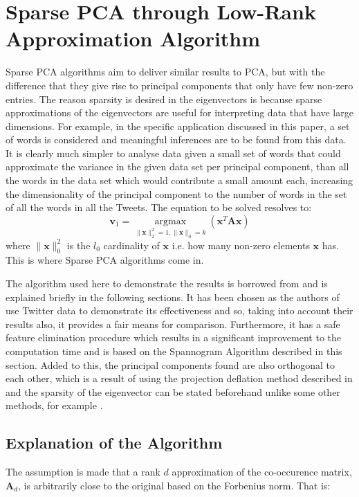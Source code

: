 \documentclass[graybox]{svmult}
\newcommand{\covmat}{\mathbf{A}}
\begin{document}
\section{Sparse PCA through Low-Rank Approximation Algorithm}\label{algorithm}

Sparse PCA algorithms aim to deliver similar results to PCA, but with the difference that they give rise to principal components that only have few non-zero entries. The reason sparsity is desired in the eigenvectors is because sparse approximations of the eigenvectors are useful for interpreting data that have large dimensions. For example, in the specific application discussed in this paper, a set of words is considered and meaningful inferences are to be found from this data. It is clearly much simpler to analyse data given a small set of words that could approximate the variance in the given data set per principal component, than all the words in the data set which would contribute a small amount each, increasing the dimensionality of the principal component to the number of words in the set of all the words in all the Tweets. The equation to be solved resolves to:
\begin{equation}
\mathbf{v}_1 = \underset{\|\mathbf{x}\|_2^2 = 1, \|\mathbf{x}\|_0 = k}{\operatorname{argmax}}\left( \mathbf{x}^T\mathbf{A}\mathbf{x}\right)
\end{equation}
where $\|\mathbf{x}\|_0^2$ is the $l_0$ cardinality of $\mathbf{x}$ i.e. how many non-zero elements $\mathbf{x}$ has. This is where Sparse PCA algorithms come in.

The algorithm used here to demonstrate the results is borrowed from \cite{dimakis} and is explained briefly in the following sections. It has been chosen as the authors of \cite{dimakis} use Twitter data to demonstrate its effectiveness and so, taking into account their results also, it provides a fair means for comparison. Furthermore, it has a safe feature elimination procedure which results in a significant improvement to the computation time and is based on the Spannogram Algorithm described in this section. Added to this, the principal components found are also orthogonal to each other, which is a result of using the projection deflation method described in \cite{Mackey_deflationmethods} and the sparsity of the eigenvector can be stated beforehand unlike some other methods, for example \cite{GPower}.

\subsection{Explanation of the Algorithm}
The assumption is made that a rank $d$ approximation of the co-occurence matrix, $\covmat_d$, is arbitrarily close to the original based on the Forbenius norm. That is:
\end{document}

